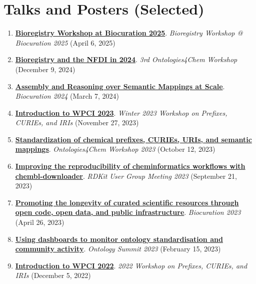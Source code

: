 \documentclass[10pt,a4paper,sans]{moderncv} %
\begin{document}
\section{Talks and Posters (Selected)}
\begin{enumerate}
\itemsep0.5em
    \item \textbf{\href{https://doi.org/10.5281/zenodo.15184414}{Bioregistry Workshop at Biocuration 2025}}. \textit{Bioregistry Workshop @ Biocuration 2025} (April 6, 2025)

    \item \textbf{\href{https://bit.ly/bioregistry-ontologies4chem-2024}{Bioregistry and the NFDI in 2024}}. \textit{3rd Ontologies4Chem Workshop} (December 9, 2024)

    \item \textbf{\href{https://bit.ly/biocuration2024-cth}{Assembly and Reasoning over Semantic Mappings at Scale}}. \textit{Biocuration 2024} (March 7, 2024)

    \item \textbf{\href{https://docs.google.com/presentation/d/1SJ-gyoctyX-WLkkULRkUDF25l5CmtZZG3xlWBegDRa8/edit?usp=sharing}{Introduction to WPCI 2023}}. \textit{Winter 2023 Workshop on Prefixes, CURIEs, and IRIs} (November 27, 2023)

    \item \textbf{\href{https://bit.ly/ontologies4chem2023-cth}{Standardization of chemical prefixes, CURIEs, URIs, and semantic mappings}}. \textit{Ontologies4Chem Workshop 2023} (October 12, 2023)

    \item \textbf{\href{https://bit.ly/cth-rdkit-ugm-2023}{Improving the reproducibility of cheminformatics workflows with chembl-downloader}}. \textit{RDKit User Group Meeting 2023} (September 21, 2023)

    \item \textbf{\href{https://docs.google.com/presentation/d/1hEryoMNyp8gwt2pvPy2ErKaw_QPvnWOmzPT0Sn4Yl4s/edit?usp=sharing}{Promoting the longevity of curated scientific resources through open code, open data, and public infrastructure}}. \textit{Biocuration 2023} (April 26, 2023)

    \item \textbf{\href{https://docs.google.com/presentation/d/1oKxBzSCZGuFlIhw6jAXw00xgEGs7KgmaVR54NEdPprw/edit?usp=sharing}{Using dashboards to monitor ontology standardisation and community activity}}. \textit{Ontology Summit 2023} (February 15, 2023)

    \item \textbf{\href{https://docs.google.com/presentation/d/1Vq-tdq_PYSmKydKXEABElgt3oqYs_ridquHDLeUFL1A/edit?usp=sharing}{Introduction to WPCI 2022}}. \textit{2022 Workshop on Prefixes, CURIEs, and IRIs} (December 5, 2022)


\end{enumerate}
\end{document}
